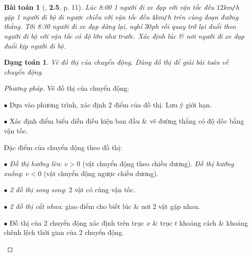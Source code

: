 \documentclass{article}
\numberwithin{equation}{section}
\newtheorem{dangtoan}{Dạng toán}[section]
\newtheorem{baitoan}{Bài toán}[section]
\begin{document}
\begin{baitoan}[\cite{Giai_Toan_Vat_Ly_10_tap_1}, \textbf{2.5}, p. 11]
	Lúc 8:00 1 người đi xe đạp với vận tốc đều $12$\emph{km\texttt{/}h} gặp 1 người đi bộ đi ngược chiều với vận tốc đều $4$\emph{km\texttt{/}h} trên cùng đoạn đường thẳng. Tới 8:30 người đi xe đạp dừng lại, nghỉ $30$\emph{ph} rồi quay trở lại đuổi theo người đi bộ với vận tốc có độ lớn như trước. Xác định lúc \& nơi người đi xe đạp đuổi kịp người đi bộ.
\end{baitoan}

\begin{dangtoan}
	Vẽ đồ thị của chuyển động. Dùng đồ thị để giải bài toán về chuyển động.
\end{dangtoan}

\begin{proof}[Phương pháp]
	Vẽ đồ thị của chuyển động:
	\begin{enumerate*}
		\item[$\bullet$] Dựa vào phương trình, xác định 2 điểm của đồ thị. Lưu ý giới hạn.
		\item[$\bullet$] Xác định điểm biểu diễn điều kiện ban đầu \& vẽ đường thẳng có độ dốc bằng vận tốc.
	\end{enumerate*}
	
	Đặc điểm của chuyển động theo đồ thị:
	\begin{enumerate*}
		\item[$\bullet$] \textit{Đồ thị hướng lên}: $v > 0$ (vật chuyển động theo chiều dương). \textit{Đồ thị hướng xuống}: $v < 0$ (vật chuyển động ngược chiều dương).
		\item[$\bullet$] \textit{2 đồ thị song song}: 2 vật có cùng vận tốc.
		\item[$\bullet$] \textit{2 đồ thị cắt nhau}: giao điểm cho biết lúc \& nơi 2 vật gặp nhau.
		\item[$\bullet$] Đồ thị của 2 chuyển động xác định trên trục $x$ \& trục $t$ khoảng cách \& khoảng chênh lệch thời gian của 2 chuyển động.
	\end{enumerate*}
\end{proof}
\end{document}
